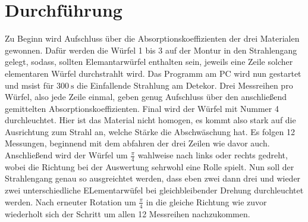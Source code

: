 \section{Durchführung}
Zu Beginn wird Aufschluss über die Absorptionskoeffizienten der drei Materialen gewonnen. 
Dafür werden die Würfel 1 bis 3 auf der Montur in den Strahlengang gelegt, sodass, sollten Elemantarwürfel enthalten sein, jeweils eine Zeile solcher elementaren Würfel 
durchstrahlt wird. Das Programm am PC wird nun gestartet und msist für $\SI{300}{\second}$ die Einfallende Strahlung am Detekor. Drei Messreihen pro Würfel, also jede Zeile einmal, geben genug Aufschluss über den anschließend gemittelten Absorptionskoeffizienten.
Final wird der Würfel mit Nummer 4 durchleuchtet. Hier ist das Material nicht homogen, es kommt also stark auf die Ausrichtung zum Strahl an, welche Stärke
die Abschwäschung hat. Es folgen 12 Messungen, beginnend mit dem abfahren der drei Zeilen wie davor auch. Anschließend wird der Würfel um 
$\frac{\pi}{4}$ wahlweise nach links oder rechts gedreht, wobei die Richtung bei der Auswertung sehrwohl eine Rolle spielt.
Nun soll der Strahlengang genau so ausgreichtet werden, dass eben zwei dann drei und wieder zwei unterschiedliche ELementarwüfel bei gleichbleibender Drehung
durchleuchtet werden. Nach erneuter Rotation um $\frac{\pi}{4}$ in die gleiche Richtung wie zuvor wiederholt sich der Schritt um 
allen 12 Messreihen nachzukommen.


